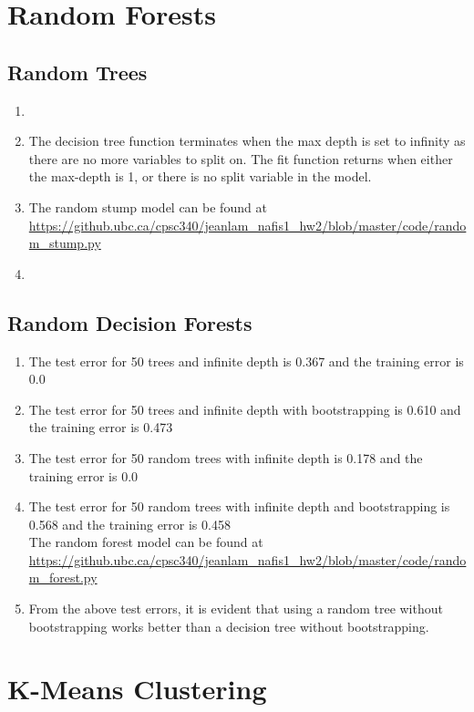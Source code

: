 \documentclass{article}
\begin{document}
\section{Random Forests}
\subsection{Random Trees}
\begin{enumerate}
\item {}
\item The decision tree function terminates when the max depth is set to infinity as there are no more variables to split on. The fit function returns when either the max-depth is 1, or there is no split variable in the model.
\item {} The random stump model can be found at \url{https://github.ubc.ca/cpsc340/jeanlam_nafis1_hw2/blob/master/code/random_stump.py}
\item {}
\end{enumerate}
\subsection{Random Decision Forests}
\begin{enumerate}
\item The test error for 50 trees and infinite depth is 0.367 and the training error is 0.0
\item The test error for 50 trees and infinite depth with bootstrapping is 0.610 and the training error is 0.473
\item The test error for 50 random trees with infinite depth is 0.178 and the training error is 0.0
\item The test error for 50 random trees with infinite depth and bootstrapping is 0.568 and the training error is 0.458 \\
The random forest model can be found at \url{https://github.ubc.ca/cpsc340/jeanlam_nafis1_hw2/blob/master/code/random_forest.py}
\item From the above test errors, it is evident that using a random tree without bootstrapping works better than a decision tree without bootstrapping. 
\end{enumerate}

\section{K-Means Clustering}
\end{document}

